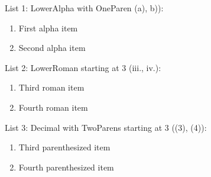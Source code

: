 \documentclass[11pt,a4paper]{article}
\begin{document}
List 1: LowerAlpha with OneParen (a), b)):

\begin{enumerate}
\item First alpha item
\item Second alpha item
\end{enumerate}

List 2: LowerRoman starting at 3 (iii., iv.):

\begin{enumerate}
\item Third roman item
\item Fourth roman item
\end{enumerate}

List 3: Decimal with TwoParens starting at 3 ((3), (4)):

\begin{enumerate}
\item Third parenthesized item
\item Fourth parenthesized item
\end{enumerate}
\end{document}
